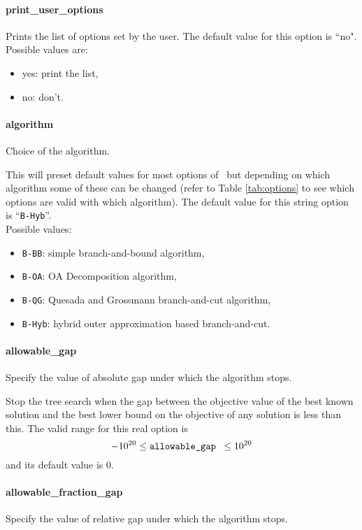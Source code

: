\paragraph{print\_user\_options}
\label{print_user_options}
Prints the list of options set by the user.
The default value for this option is ``no".\\
Possible values are:
\begin{itemize}
\item yes: print the list,
\item no: don't.
\end{itemize}


\paragraph{algorithm}
\label{algorithm} Choice of the algorithm.

       This will preset default values for most options
    of \Bonmin\ but depending on which algorithm some
of these can be changed (refer to Table \ref{tab:options} to see which options
           are valid with which algorithm).
    The default value for this string option is ``{\tt B-Hyb}''.
\\
Possible values:
\begin{itemize}
   \item {\tt B-BB}: simple branch-and-bound algorithm,
   \item {\tt B-OA}: OA Decomposition algorithm,
   \item {\tt B-QG}: Quesada and Grossmann branch-and-cut algorithm,
   \item {\tt B-Hyb}: hybrid outer approximation based branch-and-cut.
\end{itemize}


\paragraph{allowable\_gap}
\label{allowable_gap}
Specify the value of absolute gap under which the algorithm stops.

 Stop the tree search when the gap between the
objective value of the best known solution and
the best lower bound on the objective of any solution
is less than this. The valid range for this real option is
$$-10^{20} \le \hbox{\tt allowable\_gap } \le 10^{20}$$
and its default value is $0$.


\paragraph{allowable\_fraction\_gap}
\label{allowable_fraction_gap}
Specify the value of relative gap under which the algorithm stops.

